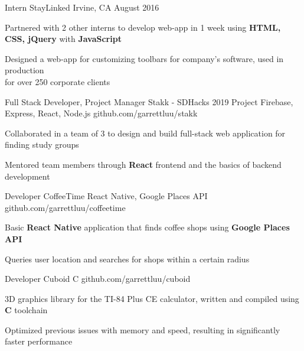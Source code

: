 \documentclass[]{awesome-cv}
\begin{document}
\begin{cventries}
	\vspace{-3mm}
	\cventry
	{Intern}
	{StayLinked}
	{Irvine, CA}
	{August 2016}
	{\begin{cvitems}
    \item {Partnered with 2 other interns to develop web-app in 1 week using
      \textbf{HTML, CSS, jQuery} with \textbf{JavaScript}}
		\item {Designed a web-app for customizing toolbars for company’s software,
      used in production\\ for over 250 corporate clients}
		\end{cvitems}}

\end{cventries}

\vspace{-5mm}
\begin{cventries}

	\cventry
  {Full Stack Developer, Project Manager}
  {Stakk - SDHacks 2019 Project}
	{Firebase, Express, React, Node.js}
	{github.com/garrettluu/stakk}
  {\begin{cvitems}
    \item{Collaborated in a team of 3 to design and build full-stack web
      application for finding study groups}
    \item{Mentored team members through \textbf{React} frontend and the basics
      of backend development}
    \end{cvitems}}

  \vspace{-3mm}
	\cventry
  {Developer}
  {CoffeeTime}
  {React Native, Google Places API}
	{github.com/garrettluu/coffeetime}
  {\begin{cvitems}
    \item{Basic \textbf{React Native} application that finds coffee shops using
      \textbf{Google Places API}}
    \item{Queries user location and searches for shops within a certain radius}
    \end{cvitems}}

  \vspace{-3mm}
	\cventry
  {Developer}
	{Cuboid}
	{C}
	{github.com/garrettluu/cuboid}
  {\begin{cvitems}
	  \item{3D graphics library for the TI-84 Plus CE calculator, written and
      compiled using \textbf{C} toolchain}
    \item{Optimized previous issues with memory and speed, resulting in
      significantly faster performance}
    \end{cvitems}}

\end{cventries}
\end{document}
